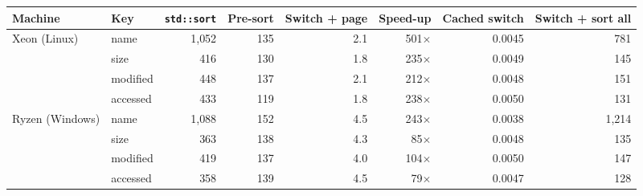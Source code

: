 \begin{tabular}{llrrrrrr}
\toprule
Machine & Key & \texttt{std::sort} & Pre-sort & Switch + page & Speed-up & Cached switch & Switch + sort all\\
\midrule
Xeon (Linux) & name & 1{,}052 & 135 & 2.1 & 501$\times$ & 0.0045 & 781\\
 & size & 416 & 130 & 1.8 & 235$\times$ & 0.0049 & 145\\
 & modified & 448 & 137 & 2.1 & 212$\times$ & 0.0048 & 151\\
 & accessed & 433 & 119 & 1.8 & 238$\times$ & 0.0050 & 131\\
\midrule
Ryzen (Windows) & name & 1{,}088 & 152 & 4.5 & 243$\times$ & 0.0038 & 1{,}214\\
 & size & 363 & 138 & 4.3 & 85$\times$ & 0.0048 & 135\\
 & modified & 419 & 137 & 4.0 & 104$\times$ & 0.0050 & 147\\
 & accessed & 358 & 139 & 4.5 & 79$\times$ & 0.0047 & 128\\
\bottomrule
\end{tabular}
